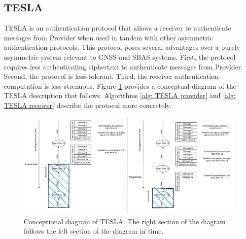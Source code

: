 \documentclass[letterpaper,times]{IONconf/IONconf}
\begin{document}
\subsection{TESLA} \label{sec: TESLA intro}

TESLA is an authentication protocol that allows a receiver to authenticate messages from Provider when used in tandem with other asymmetric authentication protocols.
This protocol poses several advantages over a purely asymmetric system relevant to GNSS and SBAS systems.
First, the protocol requires less authenticating ciphertext to authenticate messages from Provider.
Second, the protocol is loss-tolerant.
Third, the receiver authentication computation is less strenuous.
Figure \ref{fig: TESLA Diagram} provides a conceptual diagram of the TESLA description that follows.
Algorithms \ref{alg: TESLA provider} and \ref{alg: TESLA receiver} describe the protocol more concretely.

\begin{figure}
\centering
\includegraphics[width=\linewidth]{fig/TESLADiagram.pdf}
\caption{Conceptional diagram of TESLA. The right section of the diagram follows the left section of the diagram in time.}
\label{fig: TESLA Diagram}
\end{figure}
\end{document}
